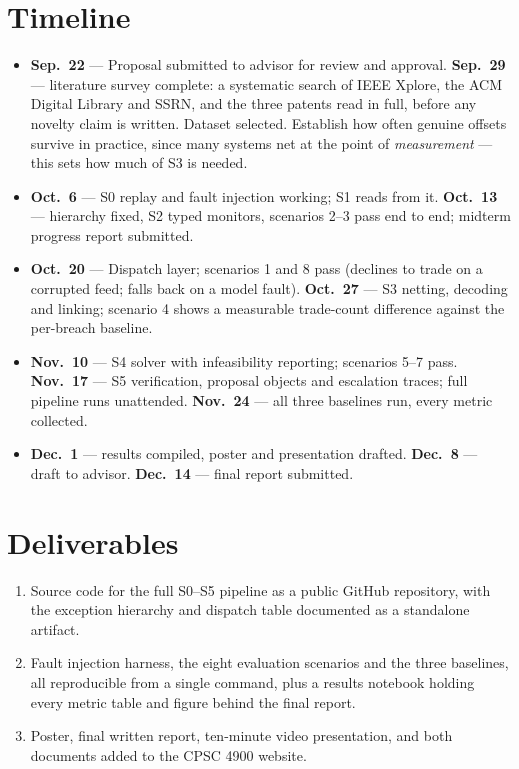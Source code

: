 \documentclass[11pt]{article}
\begin{document}
\section{Timeline}

{\small
\begin{itemize}[leftmargin=*]
\item \textbf{Sep.\ 22} --- Proposal submitted to advisor for review and approval.
  \textbf{Sep.\ 29} --- literature survey complete: a systematic search of IEEE Xplore, the
  ACM Digital Library and SSRN, and the three patents read in full, before any novelty claim
  is written. Dataset selected. Establish how often genuine offsets survive in practice,
  since many systems net at the point of \emph{measurement} --- this sets how much of S3 is
  needed.
\item \textbf{Oct.\ 6} --- S0 replay and fault injection working; S1 reads from it.
  \textbf{Oct.\ 13} --- hierarchy fixed, S2 typed monitors, scenarios 2--3 pass end to end;
  midterm progress report submitted.
\item \textbf{Oct.\ 20} --- Dispatch layer; scenarios 1 and 8 pass (declines to trade on a
  corrupted feed; falls back on a model fault). \textbf{Oct.\ 27} --- S3 netting, decoding
  and linking; scenario 4 shows a measurable trade-count difference against the per-breach
  baseline.
\item \textbf{Nov.\ 10} --- S4 solver with infeasibility reporting; scenarios 5--7 pass.
  \textbf{Nov.\ 17} --- S5 verification, proposal objects and escalation traces; full
  pipeline runs unattended. \textbf{Nov.\ 24} --- all three baselines run, every metric
  collected.
\item \textbf{Dec.\ 1} --- results compiled, poster and presentation drafted.
  \textbf{Dec.\ 8} --- draft to advisor. \textbf{Dec.\ 14} --- final report submitted.
\end{itemize}}

\section{Deliverables}

{\small
\begin{enumerate}[leftmargin=*]
\item Source code for the full S0--S5 pipeline as a public GitHub repository, with the exception
  hierarchy and dispatch table documented as a standalone artifact.
\item Fault injection harness, the eight evaluation scenarios and the three baselines, all
  reproducible from a single command, plus a results notebook holding every metric table and
  figure behind the final report.
\item Poster, final written report, ten-minute video presentation, and both documents added to
  the CPSC 4900 website.
\end{enumerate}}
\end{document}
